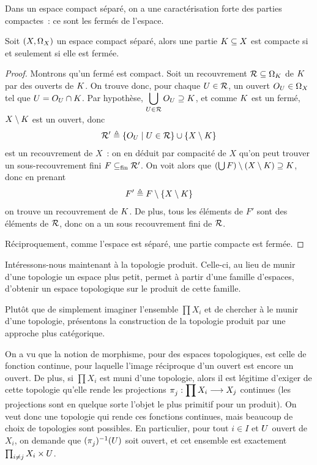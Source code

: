 \noindent
Dans un espace compact séparé, on a une caractérisation forte des parties
compactes~: ce sont les fermés de l'espace.

\begin{proposition}\label{prop.compac.equiv.ferme}
  Soit $(X,\Omega_{X})$ un espace compact séparé, alors une partie
  $K\subseteq X$ est compacte si et seulement si elle est fermée.
\end{proposition}

\begin{proof}
  Montrons qu'un fermé est compact. Soit un recouvrement
  $\mathcal R\subseteq\Omega_{K}$ de $K$ par des ouverts de $K$.
  On trouve donc, pour chaque $U\in \mathcal R$, un ouvert
  $O_{U}\in\Omega_{X}$ tel que $U = O_{U}\cap K$.
  Par hypothèse,
  $\displaystyle\bigcup_{U \in \mathcal R} O_{U} \supseteq K$,
  et comme $K$ est un fermé, $X\setminus K$ est un ouvert, donc
  \[\mathcal R' \triangleq
  \left\{ O_{U} \;\middle\vert\; U \in \mathcal R \right\}\cup\{X\setminus K\}\]
  est un recouvrement de $X$~:
  on en déduit par compacité de $X$ qu'on peut trouver un sous-recouvrement
  fini $F\subseteq_{\mathrm{fin}} \mathcal R'$. On voit alors
  que $(\bigcup F)\setminus (X\setminus K) \supseteq K$, donc en
  prenant
  \[F' \triangleq F\setminus\{X\setminus K\}\]
  on trouve un recouvrement de $K$. De plus, tous les éléments de $F'$ sont
  des éléments de $\mathcal R$, donc on a un sous recouvrement fini de
  $\mathcal R$.

  Réciproquement, comme l'espace est séparé, une partie compacte est fermée.
\end{proof}

Intéressons-nous maintenant à la topologie produit. Celle-ci, au lieu de
munir d'une topologie un espace plus petit, permet à partir d'une famille
d'espaces, d'obtenir un espace topologique sur le produit de cette famille.

Plutôt que de simplement imaginer l'ensemble $\prod X_i$ et de chercher à le
munir d'une topologie, présentons la construction de la topologie produit par
une approche plus catégorique.

On a vu que la notion de morphisme, pour des espaces topologiques, est celle de
fonction continue, pour laquelle l'image réciproque d'un ouvert est encore un
ouvert. De plus, si $\prod X_i$ est muni d'une topologie, alors il est légitime
d'exiger de cette topologie qu'elle rende les projections
$\mathop{\pi_{j}^{}} : \displaystyle \prod X_i \longrightarrow X_j$ continues (les projections sont en
quelque sorte l'objet le plus primitif pour un produit). On veut donc une
topologie qui rende ces fonctions continues, mais beaucoup de choix de
topologies sont possibles. En particulier, pour tout $i \in I$ et $U$
ouvert de $X_i$, on demande que $(\mathop{\pi_{j}^{}})^{-1}(U)$ soit ouvert, et cet
ensemble est exactement $\prod_{i\neq j} X_i \times U$.

